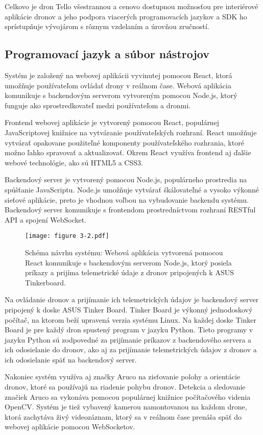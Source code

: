 Celkovo je dron Tello všestrannou a cenovo dostupnou možnosťou pre interiérové aplikácie dronov a jeho podpora viacerých programovacích jazykov a SDK ho sprístupňuje vývojárom s rôznym vzdelaním a úrovňou zručností. 

\subsection{Programovací jazyk a súbor nástrojov}
Systém je založený na webovej aplikácii vyvinutej pomocou React, ktorá umožňuje používateľom ovládať drony v reálnom čase. Webová aplikácia komunikuje s backendovým serverom vytvoreným pomocou Node.js, ktorý funguje ako sprostredkovateľ medzi používateľom a dronmi.

Frontend webovej aplikácie je vytvorený pomocou React, populárnej JavaScriptovej knižnice na vytváranie používateľských rozhraní. React umožňuje vytvárať opakovane použiteľné komponenty používateľského rozhrania, ktoré možno ľahko spravovať a aktualizovať. Okrem React využíva frontend aj ďalšie webové technológie, ako sú HTML5 a CSS3.

Backendový server je vytvorený pomocou Node.js, populárneho prostredia na spúšťanie JavaScriptu. Node.js umožňuje vytvárať škálovateľné a vysoko výkonné sieťové aplikácie, preto je vhodnou voľbou na vybudovanie backendu systému. Backendový server komunikuje s frontendom prostredníctvom rozhraní RESTful API a spojení WebSocket.

\begin{figure}[ht!]
    \centering
    \texttt{[image: figure 3-2.pdf]}
    \caption{Schéma návrhu systému: Webová aplikácia vytvorená pomocou React komunikuje s backendovým serverom Node.js, ktorý posiela príkazy a prijíma telemetrické údaje z dronov pripojených k ASUS Tinkerboard.}
    \label{o:3-2}
\end{figure}  

Na ovládanie dronov a prijímanie ich telemetrických údajov je backendový server pripojený k doske ASUS Tinker Board. Tinker Board je výkonný jednodoskový počítač, na ktorom beží upravená verzia systému Linux. Na každej doske Tinker Board je pre každý dron spustený program v jazyku Python. Tieto programy v jazyku Python sú zodpovedné za prijímanie príkazov z backendového servera a ich odosielanie do dronov, ako aj za prijímanie telemetrických údajov z dronov a ich odosielanie späť na backendový server.

Nakoniec systém využíva aj značky Aruco na zisťovanie polohy a orientácie dronov, ktoré sa používajú na riadenie pohybu dronov. Detekcia a sledovanie značiek Aruco sa vykonáva pomocou populárnej knižnice počítačového videnia OpenCV. Systém je tiež vybavený kamerou namontovanou na každom drone, ktorá zachytáva živý videozáznam, ktorý sa v reálnom čase prenáša späť do webovej aplikácie pomocou WebSocketov.
